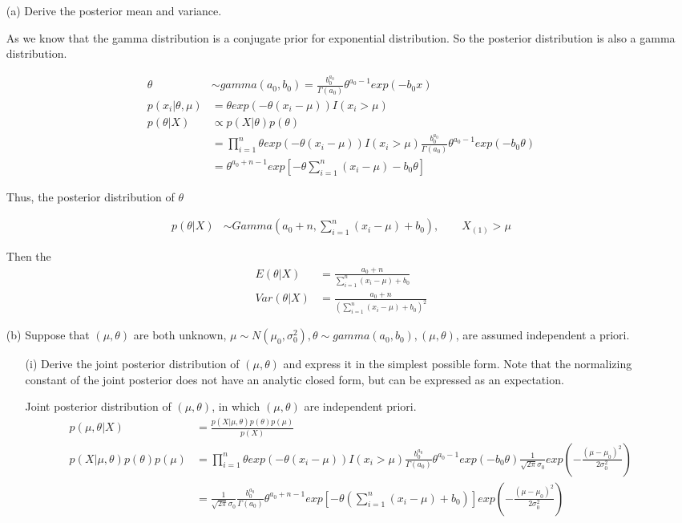 \begin{itemize}
	\item[(a)]  Derive the posterior mean and variance.

	As we know that the gamma distribution is a conjugate prior for exponential distribution. So the posterior distribution is also a gamma distribution.
	
	\begin{align*}
		\theta & \sim gamma(a_0, b_0) = \frac{b_0^{a_0}}{\Gamma(a_0)} \theta^{a_0-1} exp(-b_0 x) \\
		p(x_i|\theta, \mu) &= \theta exp(-\theta (x_i-\mu)) I(x_i> \mu) \\
		p(\theta|X) & \propto p(X|\theta) p(\theta) \\
		&= \prod_{i=1}^n \theta exp(-\theta (x_i-\mu)) I(x_i> \mu) \frac{b_0^{a_0}}{\Gamma(a_0)} \theta^{a_0-1} exp(-b_0 \theta) \\
		&= \theta^{a_0 + n-1} exp[ -\theta \sum_{i=1}^n (x_i-\mu) - b_0 \theta]
	\end{align*}

Thus, the posterior distribution of $\theta$

\begin{align*}
	p(\theta|X) & \sim Gamma(a_0 + n, \sum_{i=1}^n (x_i-\mu) + b_0) , \qquad X_{(1)} > \mu
\end{align*}
	
Then the 
\begin{align*}
	E(\theta|X) & = \frac{a_0 + n}{\sum_{i=1}^n (x_i-\mu) + b_0} \\
	Var(\theta|X) &= \frac{a_0 + n}{(\sum_{i=1}^n (x_i-\mu) + b_0)^2} 
\end{align*}


\item[(b)] Suppose that $(\mu, \theta)$ are both unknown, $\mu \sim N(\mu_0, \sigma_0^2), \theta \sim gamma(a_0, b_0), (\mu, \theta)$, are assumed independent a priori.

\begin{itemize}
	\item [(i)] Derive the joint posterior distribution of $(\mu, \theta)$  and express it in the simplest possible form. Note that the normalizing constant of the joint posterior does not have an analytic closed form, but can be expressed as an expectation.
	
	Joint posterior distribution of $(\mu, \theta)$, in which $(\mu, \theta)$ are independent priori.
\begin{align*}
	p(\mu, \theta|X) & = \frac{p(X|\mu, \theta) p(\theta) p(\mu)}{p(X)} \\
	p(X|\mu, \theta) p(\theta) p(\mu) &= \prod_{i=1}^n \theta exp(-\theta (x_i-\mu)) I(x_i> \mu) \frac{b_0^{a_0}}{\Gamma(a_0)} \theta^{a_0-1} exp(-b_0 \theta) \frac{1}{\sqrt{2\pi} \sigma_0} exp(-\frac{(\mu-\mu_0)^2}{2 \sigma_0^2})\\
	&= \frac{1}{\sqrt{2\pi} \sigma_0} \frac{b_0^{a_0}}{\Gamma(a_0)} \theta^{a_0+n-1} exp[-\theta (\sum_{i=1}^n (x_i-\mu)  + b_0)]   exp(-\frac{(\mu-\mu_0)^2}{2 \sigma_0^2})\\
\end{align*}


\end{itemize}
\end{itemize}
